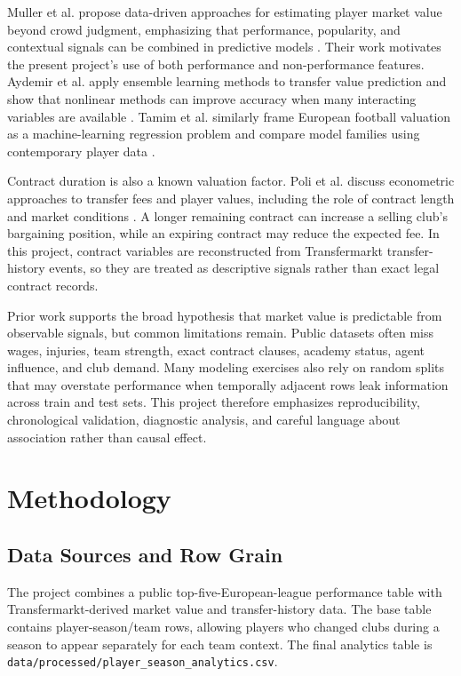 \documentclass[conference]{IEEEtran}
\begin{document}
Muller et al. propose data-driven approaches for estimating player market value beyond crowd judgment, emphasizing that performance, popularity, and contextual signals can be combined in predictive models \cite{muller2017beyond}. Their work motivates the present project's use of both performance and non-performance features. Aydemir et al. apply ensemble learning methods to transfer value prediction and show that nonlinear methods can improve accuracy when many interacting variables are available \cite{aydemir2022ensemble}. Tamim et al. similarly frame European football valuation as a machine-learning regression problem and compare model families using contemporary player data \cite{tamim2025football}.

Contract duration is also a known valuation factor. Poli et al. discuss econometric approaches to transfer fees and player values, including the role of contract length and market conditions \cite{poli2022contract}. A longer remaining contract can increase a selling club's bargaining position, while an expiring contract may reduce the expected fee. In this project, contract variables are reconstructed from Transfermarkt transfer-history events, so they are treated as descriptive signals rather than exact legal contract records.

Prior work supports the broad hypothesis that market value is predictable from observable signals, but common limitations remain. Public datasets often miss wages, injuries, team strength, exact contract clauses, academy status, agent influence, and club demand. Many modeling exercises also rely on random splits that may overstate performance when temporally adjacent rows leak information across train and test sets. This project therefore emphasizes reproducibility, chronological validation, diagnostic analysis, and careful language about association rather than causal effect.

\section{Methodology}
\subsection{Data Sources and Row Grain}
The project combines a public top-five-European-league performance table with Transfermarkt-derived market value and transfer-history data. The base table contains player-season/team rows, allowing players who changed clubs during a season to appear separately for each team context. The final analytics table is \texttt{data/processed/player\_season\_analytics.csv}.
\end{document}
